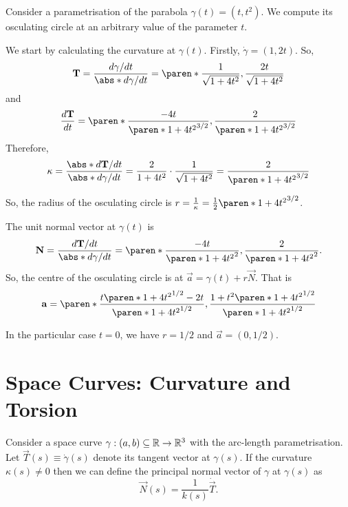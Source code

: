 \documentclass[11pt]{penrose}
\newcommand{\vT}{\vec{T}}
\newcommand{\vN}{\vec{N}}
\begin{document}
\begin{negg}
    Consider a parametrisation of the parabola $\gamma(t) = (t, t^2)$. We compute its osculating circle at an arbitrary value of the parameter $t$.

    We start by calculating the curvature at $\gamma(t)$. Firstly, $\dot{\gamma} = (1, 2t)$. So,
    \begin{equation}
        \vT = \frac{d\gamma/dt}{\abs*{ d\gamma/dt }} = \paren*{ \frac{1}{\sqrt{1 + 4t^2}}, \frac{2t}{\sqrt{1 + 4t^2}} }
    \end{equation}
    and
    \begin{equation}
        \frac{d\vT}{dt} = \paren*{ \frac{-4t}{\paren*{1+4t^2}^{3/2}}, \frac{2}{\paren*{1+4t^2}^{3/2}} }
    \end{equation}
    Therefore,
    \begin{equation}
        \kappa
        = \frac{\abs*{ d\vT/dt }}{\abs*{ d\gamma/dt }}
        = \frac{2}{1+4t^2} \cdot \frac{1}{\sqrt{1 + 4t^2}}
        = \frac{2}{ \paren*{1+4t^2}^{3/2} }
    \end{equation}

    So, the radius of the osculating circle is $r = \frac{1}{\kappa} = \frac{1}{2}\paren*{1+4t^2}^{3/2}$.

    The unit normal vector at $\gamma(t)$ is
    \begin{equation}
        \vN
        = \frac{ d\vT/dt }{\abs*{ d\gamma/dt }}
        = \paren*{ \frac{-4t}{\paren*{1+4t^2}^2}, \frac{2}{\paren*{1+4t^2}^2} }.
    \end{equation}
    So, the centre of the osculating circle is at $\vec{a} = \gamma(t) + r\vN$. That is
    \begin{equation}
        \vec{a}
        = \paren*{ \frac{t\paren*{1+4t^2}^{1/2}-2t}{\paren*{1+4t^2}^{1/2}}, \frac{1 + t^2 \paren*{1+4t^2}^{1/2}}{\paren*{1+4t^2}^{1/2}} }
    \end{equation}

    In the particular case $t=0$, we have $r = 1/2$ and $\vec{a} = (0, 1/2)$.
\end{negg}

\section{Space Curves: Curvature and Torsion}
Consider a space curve $\gamma : (a, b) \subseteq \mathbb{R} \to \mathbb{R}^3$ with the arc-length parametrisation. Let $\vT(s) \equiv \dot{\gamma}(s)$ denote its tangent vector at $\gamma(s)$. If the curvature $\kappa(s) \neq 0$ then we can define the principal normal vector of $\gamma$ at $\gamma(s)$ as
\begin{equation}
    \vN(s) = \frac{1}{k(s)} \dot{\vT}.
\end{equation}
\end{document}
